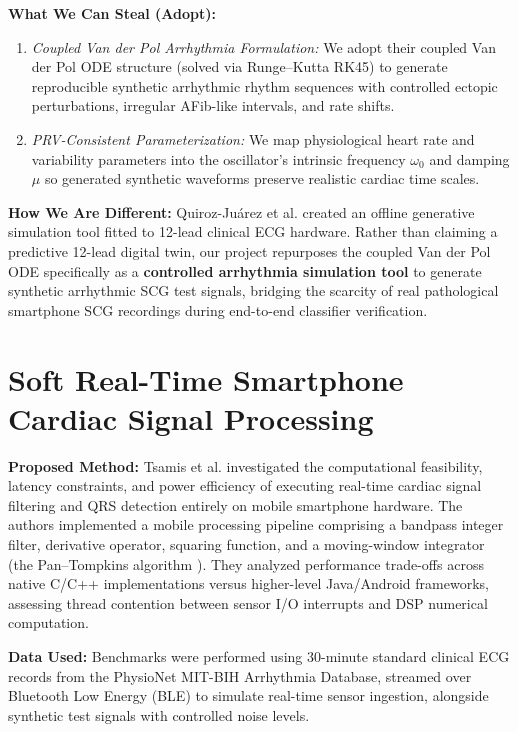 \textbf{What We Can Steal (Adopt):}
\begin{enumerate}
    \item \textit{Coupled Van der Pol Arrhythmia Formulation:} We adopt their coupled Van der Pol ODE structure (solved via Runge--Kutta RK45) to generate reproducible synthetic arrhythmic rhythm sequences with controlled ectopic perturbations, irregular AFib-like intervals, and rate shifts.
    \item \textit{PRV-Consistent Parameterization:} We map physiological heart rate and variability parameters into the oscillator's intrinsic frequency $\omega_0$ and damping $\mu$ so generated synthetic waveforms preserve realistic cardiac time scales.
\end{enumerate}

\textbf{How We Are Different:} Quiroz-Ju{\'a}rez et al. created an offline generative simulation tool fitted to 12-lead clinical ECG hardware. Rather than claiming a predictive 12-lead digital twin, our project repurposes the coupled Van der Pol ODE specifically as a \textbf{controlled arrhythmia simulation tool} to generate synthetic arrhythmic SCG test signals, bridging the scarcity of real pathological smartphone SCG recordings during end-to-end classifier verification.

\newpage
\section{Soft Real-Time Smartphone Cardiac Signal Processing \cite{tsamis2017soft}}

\textbf{Proposed Method:} Tsamis et al. \cite{tsamis2017soft} investigated the computational feasibility, latency constraints, and power efficiency of executing real-time cardiac signal filtering and QRS detection entirely on mobile smartphone hardware. The authors implemented a mobile processing pipeline comprising a bandpass integer filter, derivative operator, squaring function, and a moving-window integrator (the Pan--Tompkins algorithm \cite{pan1985real}). They analyzed performance trade-offs across native C/C++ implementations versus higher-level Java/Android frameworks, assessing thread contention between sensor I/O interrupts and DSP numerical computation.

\textbf{Data Used:} Benchmarks were performed using 30-minute standard clinical ECG records from the PhysioNet MIT-BIH Arrhythmia Database, streamed over Bluetooth Low Energy (BLE) to simulate real-time sensor ingestion, alongside synthetic test signals with controlled noise levels.

